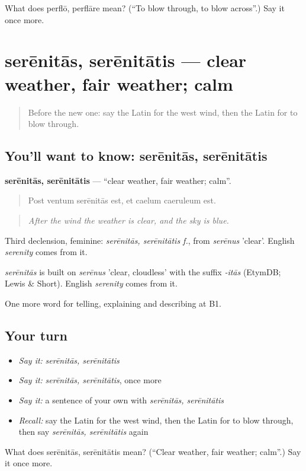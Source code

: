 \begin{tcolorbox}[breakable,colback=teal!4,colframe=teal!35!black,title={Before you move on}]
What does perflō, perflāre mean? (\textquotedblleft{}To blow through, to blow across\textquotedblright{}.) Say it once more.
\end{tcolorbox}
\section[serēnitās, serēnitātis]{serēnitās, serēnitātis — clear weather, fair weather; calm}

\label{lesson:LA-C487-serenitas}



\begin{quote}
Before the new one: say the Latin for the west wind, then the Latin for to blow through.
\end{quote}

\subsection*{You'll want to know: serēnitās, serēnitātis}
\textbf{serēnitās, serēnitātis} — \textquotedblleft{}clear weather, fair weather; calm\textquotedblright{}.

\begin{quote}
Post ventum serēnitās est, et caelum caeruleum est.
\end{quote}

\begin{quote}
\emph{After the wind the weather is clear, and the sky is blue.}
\end{quote}

Third declension, feminine: \emph{serēnitās, serēnitātis f.}, from \emph{serēnus} 'clear'. English \emph{serenity} comes from it.

\begin{cousinweb}
\emph{serēnitās} is built on \emph{serēnus} 'clear, cloudless' with the suffix \emph{-itās} (EtymDB; Lewis \& Short). English \emph{serenity} comes from it.
\end{cousinweb}

\begin{grammarlens}[title={What you've built}]
One more word for telling, explaining and describing at B1.
\end{grammarlens}

\subsection*{Your turn}
\begin{itemize}
\raggedright
  \item \emph{Say it:} \emph{serēnitās, serēnitātis}
  \item \emph{Say it:} \emph{serēnitās, serēnitātis}, once more
  \item \emph{Say it:} a sentence of your own with \emph{serēnitās, serēnitātis}
  \item \emph{Recall:} say the Latin for the west wind, then the Latin for to blow through, then say \emph{serēnitās, serēnitātis} again
\end{itemize}

\begin{tcolorbox}[breakable,colback=teal!4,colframe=teal!35!black,title={Before you move on}]
What does serēnitās, serēnitātis mean? (\textquotedblleft{}Clear weather, fair weather; calm\textquotedblright{}.) Say it once more.
\end{tcolorbox}
